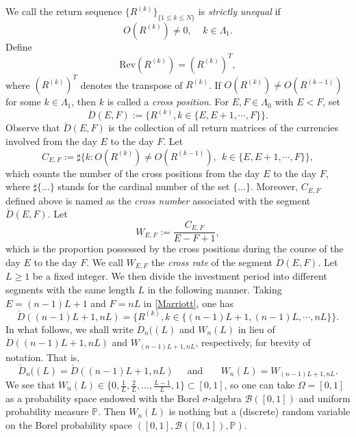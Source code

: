 \documentclass[11pt]{article}
\numberwithin{equation}{section}
\begin{document}
We call the return sequence $\{R^{(k)}\}_{\{1\le k\le N\}}$  is {\it strictly unequal} if 
\begin{equation*}
O(R^{(k)})\neq 0,~~~~~k\in \Lambda_1.
\end{equation*}
Define
\begin{equation*}
\mbox{Rev} (R^{(k)})=(R^{(k)})^T,
\end{equation*}
where $(R^{(k)})^T$ denotes the transpose of $R^{(k)}$. 
If  $ O(R^{(k)})\neq O(R^{(k-1)}) $  for some $k\in \Lambda_1$, then $k$ is called a {\it cross position}.  For $E,F\in \Lambda_0$ with $E<F$, set 
\begin{equation}\label{Marriott}
 \acute{D}(E,F):= \{R^{(k)},  k\in \{E, E+1, \cdots, F\}\}.
\end{equation}
Observe  that $\acute{D}(E,F)$ is the collection of all return matrices of the currencies involved  from the day $E$ to the day $F.$ Let 
 \begin{equation*}
C_{E,F}:= \sharp \{k:O(R^{(k)})\neq O(R^{(k-1)}), ~~k\in \{E, E+1, \cdots, F\}\},
\end{equation*}
 which counts the number of the cross positions from the day $E$ to the day $F$, where $\sharp \{...\}$ stands for the cardinal number of the set $\{...\}$. Moreover, $C_{E,F}$  defined above is 
 named as the {\it cross number} associated with the segment  $\acute{D}(E,F).$ Let \begin{equation}\label{Marina}
W_{E,F}:= \frac{C_{E,F}}{E-F+1},
\end{equation}
which is the proportion possessed  by the cross positions during the course of the day $E$ to the day $F$. We call $W_{E,F}$ the {\it cross rate} of the segment $\acute{D}(E,F)$. 
Let $L \ge1$ be a fixed integer. We then divide the investment period into different segments with the same length $L$ in the following manner. Taking $E=(n-1)L+1$ and $F=nL$ 
in \eqref{Marriott}, one has  
 \begin{equation*} 
 \acute{D}((n-1)L+1,nL)= \{R^{(k)},  k\in \{(n-1)L+1, (n-1)L, \cdots, nL\}\}.
\end{equation*}
In what follows, we shall write $\acute{D}_n((L)$  and $W_n(L)$ in lieu  of $ \acute{D}((n-1)L+1,nL)$  and $W_{(n-1)L+1,nL}$, respectively,  for brevity of notation.  That is, 
 \begin{equation*}
\acute{D}_n((L)= \acute{D}((n-1)L+1,nL)~~~~~\mbox{ and }~~~~~~~W_n(L)= W_{(n-1)L+1,nL}.
\end{equation*}
We see that $W_n(L)\in\{0,\frac{1}{L},\frac{2}{L},...,\frac{L-1}{L},1\}\subset[0,1]$,  so one can take $\Omega=[0,1]$ as a probability space endowed with the Borel $\sigma$-algebra 
$\mathcal{B}([0,1])$ and uniform probability measure $\mathbb{P}$. Then $W_n(L)$ is nothing but a (discrete) random variable on the Borel probability space $([0,1],\mathcal{B}([0,1]),\mathbb{P})$.    
\end{document}

